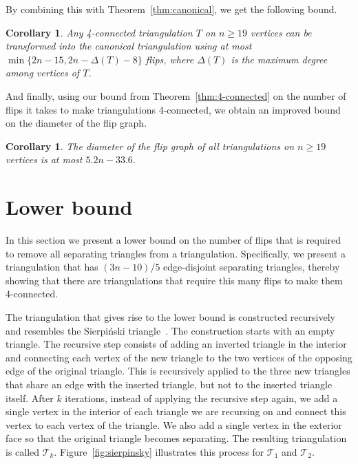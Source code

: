 \pdfoutput=1 \documentclass[12pt]{elsarticle}
\newtheorem{coro}[defin]{Corollary}
\newenvironment{corollary}{\begin{coro} \sl}{\end{coro}}
\begin{document}
\noindent By combining this with Theorem~\ref{thm:canonical}, we get the following bound.

\begin{corollary}
 \label{cor:4-contocanon}
 Any 4-connected triangulation $T$ on $n \geq 19$ vertices can be transformed into the canonical triangulation using at most $\min\{2n - 15, 2n - \Delta(T) - 8\}$ flips, where $\Delta(T)$ is the maximum degree among vertices of $T$.
\end{corollary}


\noindent And finally, using our bound from Theorem~\ref{thm:4-connected} on the number of flips it takes to make triangulations 4-connected, we obtain an improved bound on the diameter of the flip graph.

\begin{corollary}
 The diameter of the flip graph of all triangulations on $n \geq 19$ vertices is at most $5.2 n - 33.6$.
\end{corollary}


\section{Lower bound}
\label{sec:lb}

\noindent In this section we present a lower bound on the number of flips that is required to remove all separating triangles from a triangulation. Specifically, we present a triangulation that has $(3n - 10)/5$ edge-disjoint separating triangles, thereby showing that there are triangulations that require this many flips to make them 4-connected.

The triangulation that gives rise to the lower bound is constructed recursively and resembles the Sierpi\'nski triangle~\cite{sierpinski1915suc}. The construction starts with an empty triangle. The recursive step consists of adding an inverted triangle in the interior and connecting each vertex of the new triangle to the two vertices of the opposing edge of the original triangle. This is recursively applied to the three new triangles that share an edge with the inserted triangle, but not to the inserted triangle itself. After $k$ iterations, instead of applying the recursive step again, we add a single vertex in the interior of each triangle we are recursing on and connect this vertex to each vertex of the triangle. We also add a single vertex in the exterior face so that the original triangle becomes separating. The resulting triangulation is called $\mathcal{T}_k$. Figure~\ref{fig:sierpinsky} illustrates this process for $\mathcal{T}_1$ and $\mathcal{T}_2$.
\end{document}
